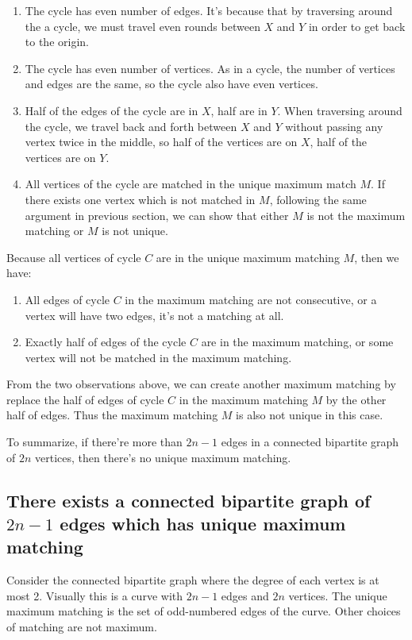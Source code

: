 \begin{enumerate}
  \item The cycle has even number of edges. It's because that by traversing around the a cycle, we must travel even rounds between $X$ and $Y$ in order to get back to the origin.
  \item The cycle has even number of vertices. As in a cycle, the number of vertices and edges are the same, so the cycle also have even vertices.
  \item Half of the edges of the cycle are in $X$, half are in $Y$. When traversing around the cycle, we travel back and forth between $X$ and $Y$ without passing any vertex twice in the middle, so half of the vertices are on $X$, half of the vertices are on $Y$.
  \item All vertices of the cycle are matched in the unique maximum match $M$. If there exists one vertex which is not matched in $M$, following the same argument in previous section, we can show that either $M$ is not the maximum matching or $M$ is not unique.
\end{enumerate}

Because all vertices of cycle $C$ are in the unique maximum matching $M$, then we have:

\begin{enumerate}
  \item All edges of cycle $C$ in the maximum matching are not consecutive, or a vertex will have two edges, it's not a matching at all.
  \item Exactly half of edges of the cycle $C$ are in the maximum matching, or some vertex will not be matched in the maximum matching.
\end{enumerate}

From the two observations above, we can create another maximum matching by replace the half of edges of cycle $C$ in the maximum matching $M$ by the other half of edges. Thus the maximum matching $M$ is also not unique in this case.

To summarize, if there're more than $2n-1$ edges in a connected bipartite graph of $2n$ vertices, then there's no unique maximum matching.

\subsection{There exists a connected bipartite graph of $2n-1$ edges which has unique maximum matching}

Consider the connected bipartite graph where the degree of each vertex is at most 2. Visually this is a curve with $2n-1$ edges and $2n$ vertices. The unique maximum matching is the set of odd-numbered edges of the curve. Other choices of matching are not maximum.
